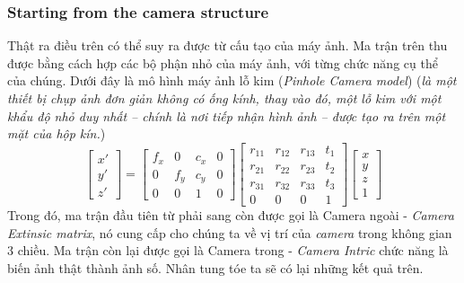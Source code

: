 \documentclass{article}
\begin{document}
\subsubsection{Starting from the camera structure}
Thật ra điều trên có thể suy ra được từ cấu tạo của máy ảnh. Ma trận trên thu được bằng cách hợp các bộ phận nhỏ của máy ảnh, với từng chức năng cụ thể của chúng. Dưới đây là mô hình máy ảnh lỗ kim (\textit{Pinhole Camera model}) (\textit{là một thiết bị chụp ảnh đơn giản không có ống kính, thay vào đó, một lỗ kim với một khẩu độ nhỏ duy nhất – chính là nơi tiếp nhận hình ảnh – được tạo ra trên một mặt của hộp kín.})
\begin{equation}
\begin{bmatrix}
    x'\\y'\\z'
\end{bmatrix} = \begin{bmatrix}
    f_x&0&c_x&0\\
    0&f_y&c_y&0\\
    0&0&1&0
\end{bmatrix}
\begin{bmatrix}
    r_{11}&r_{12}&r_{13}&t_{1}\\
    r_{21}&r_{22}&r_{23}&t_{2}\\
    r_{31}&r_{32}&r_{33}&t_{3}\\
    0&0&0&1
\end{bmatrix}
\begin{bmatrix}
    x\\y\\z\\1
\end{bmatrix}
\label{eq9}
\end{equation}
Trong đó, ma trận đầu tiên từ phải sang còn được gọi là Camera ngoài - \textit{Camera Extinsic matrix}, nó cung cấp cho chúng ta về vị trí của \textit{camera} trong không gian 3 chiều. Ma trận còn lại được gọi là Camera trong - \textit{Camera Intric} chức năng là biến ảnh thật thành ảnh số. Nhân tung tóe ta sẽ có lại những kết quả trên.
\end{document}

